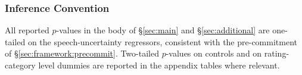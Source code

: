 \subsubsection{Inference Convention}

All reported $p$-values in the body of \S\ref{sec:main} and \S\ref{sec:additional} are one-tailed on the speech-uncertainty regressors, consistent with the pre-commitment of \S\ref{sec:framework:precommit}. Two-tailed $p$-values on controls and on rating-category level dummies are reported in the appendix tables where relevant.
